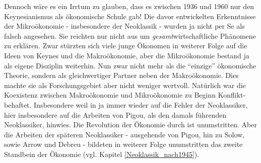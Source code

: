 Dennoch wäre es ein Irrtum zu glauben, dass es zwischen 1936 und 1960 nur den Keynesianismus als ökonomische Schule gab! 
Die davor entwickelten Erkenntnisse der Mikroökonomie - insbesondere der Neoklassik - wurden ja nicht per Se als falsch angesehen. Sie reichten nur nicht aus um \textit{gesamt}wirtschaftliche Phänomene zu erklären. Zwar stürzten sich viele junge Ökonomen in weiterer Folge auf die Ideen von Keynes und die Makroökonomie, aber die Mikroökonomie bestand ja als eigene Disziplin weiterhin. Nun zwar nicht mehr als die "`einzige"' ökonomische Theorie, sondern als gleichwertiger Partner neben der Makroökonomie. Dies machte sie als Forschungsgebiet aber nicht weniger wertvoll. Natürlich war die Koexistenz zwischen Makroökonomie und Mikroökonomie zu Beginn Konflikt-behaftet. Insbesondere weil in \textcite{Keynes1936} ja immer wieder auf die Fehler der Neoklassiker, hier insbesondere auf die Arbeiten von Pigou, als den damals führenden Neoklassiker, hinwies. Die Revolution der Ökonomie durch \textcite{Keynes1936} ist unumstritten. Aber die Arbeiten der späteren Neoklassiker - ausgehende von Pigou, hin zu Solow, sowie Arrow und Debreu - bildeten in weiterer Folge unumstritten das zweite Standbein der Ökonomie (vgl. Kapitel \ref{Neoklassik_nach1945}).
